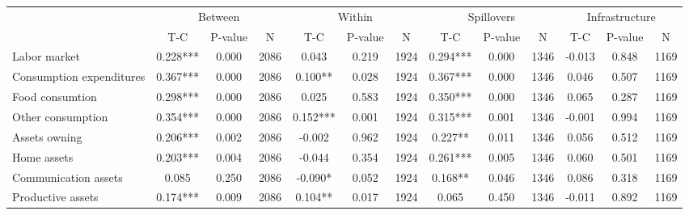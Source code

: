 
\begin{tabular}{l*{12}{c}}\hline&\multicolumn{3}{c}{Between}&\multicolumn{3}{c}{Within}&\multicolumn{3}{c}{Spillovers}&\multicolumn{3}{c}{Infrastructure} \\ \cmidrule(r){2-4}\cmidrule(l){5-7}\cmidrule(l){8-10}\cmidrule(l){9-13} & {T-C} & {P-value} & {N} & {T-C} & {P-value} & {N}  & {T-C} & {P-value} & {N} & {T-C} & {P-value} & {N} \\ \midrule

 Labor market &        0.228*** &        0.000 & 2086    &        0.043 &        0.219 & 1924    &        0.294*** &        0.000 & 1346 &       -0.013 &        0.848 & 1169 \\ 

 Consumption expenditures &        0.367*** &        0.000 & 2086    &        0.100** &        0.028 & 1924    &        0.367*** &        0.000 & 1346 &        0.046 &        0.507 & 1169 \\ 

 Food consumtion &        0.298*** &        0.000 & 2086    &        0.025 &        0.583 & 1924    &        0.350*** &        0.000 & 1346 &        0.065 &        0.287 & 1169 \\ 

 Other consumption &        0.354*** &        0.000 & 2086    &        0.152*** &        0.001 & 1924    &        0.315*** &        0.001 & 1346 &       -0.001 &        0.994 & 1169 \\ 

 Assets owning &        0.206*** &        0.002 & 2086    &       -0.002 &        0.962 & 1924    &        0.227** &        0.011 & 1346 &        0.056 &        0.512 & 1169 \\ 

 Home assets &        0.203*** &        0.004 & 2086    &       -0.044 &        0.354 & 1924    &        0.261*** &        0.005 & 1346 &        0.060 &        0.501 & 1169 \\ 

 Communication assets &        0.085 &        0.250 & 2086    &       -0.090* &        0.052 & 1924    &        0.168** &        0.046 & 1346 &        0.086 &        0.318 & 1169 \\ 

 Productive assets &        0.174*** &        0.009 & 2086    &        0.104** &        0.017 & 1924    &        0.065 &        0.450 & 1346 &       -0.011 &        0.892 & 1169 \\ 


\end{tabular}
